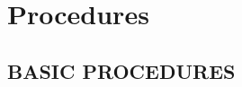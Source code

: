 \part{Procedures}

\chapter{BASIC PROCEDURES}
\localtableofcontents
\cleardoublepage





\cleardoublepage